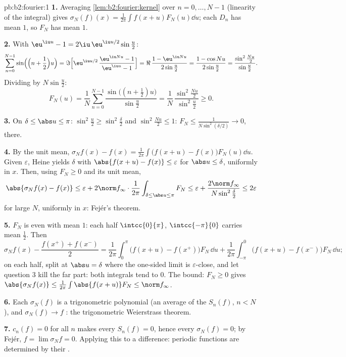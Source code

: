 \begin{solution}{pb:b2:fourier:1}
\textbf{1.} Averaging \cref{lem:b2:fourier:kernel} over $n = 0,
\dots, N-1$ (linearity of the integral) gives $\sigma_N(f)(x) =
\frac{1}{2\pi}\int f(x+u)F_N(u)\dd u$; each $D_n$ has mean
$1$, so $F_N$ has mean $1$.

\textbf{2.} With $\eu^{\iu u} - 1 = 2\iu\,\eu^{\iu
u/2}\sin\frac u2$:
\[
\sum_{n=0}^{N-1}\sin\Bigl(\Bigl(n + \frac12\Bigr)u\Bigr)
= \Im\Bigl[\eu^{\iu u/2}\,\frac{\eu^{\iu Nu} - 1}{\eu^{\iu u}
- 1}\Bigr]
= \Re\,\frac{1 - \eu^{\iu Nu}}{2\sin\frac u2}
= \frac{1 - \cos Nu}{2\sin\frac u2}
= \frac{\sin^2\frac{Nu}2}{\sin\frac u2} .
\]
Dividing by $N\sin\frac u2$:
\[
F_N(u) = \frac1N\sum_{n=0}^{N-1}
\frac{\sin\bigl((n+\frac12)u\bigr)}{\sin\frac u2}
= \frac{1}{N}\,
\frac{\sin^2\frac{Nu}{2}}{\sin^2\frac u2} \geq 0 .
\]

\textbf{3.} On $\delta \leq \abs u \leq \pi$: $\sin^2\frac u2
\geq \sin^2\frac\delta2$ and $\sin^2\frac{Nu}2 \leq 1$: $F_N
\leq \frac{1}{N\sin^2(\delta/2)} \to 0$,  there.

\textbf{4.} By the unit mean, $\sigma_Nf(x) - f(x) =
\frac{1}{2\pi}\int\bigl(f(x+u) - f(x)\bigr)F_N(u)\dd u$. Given
$\varepsilon$, Heine yields $\delta$ with $\abs{f(x+u) - f(x)}
\leq \varepsilon$ for $\abs u \leq \delta$, uniformly in $x$.
Then, using $F_N \geq 0$ and its unit mean,
\[
\abs{\sigma_Nf(x) - f(x)}
\leq \varepsilon +
2\norm f_\infty\cdot\frac{1}{2\pi}
\int_{\delta\leq\abs u\leq\pi}F_N
\leq \varepsilon + \frac{2\norm
f_\infty}{N\sin^2\frac\delta2}
\leq 2\varepsilon
\]
for large $N$, uniformly in $x$: Fej\'er's theorem.

\textbf{5.} $F_N$ is even with mean $1$: each half
$\intcc{0}{\pi}$, $\intcc{-\pi}{0}$ carries mean $\frac12$.
Then
\[
\sigma_Nf(x) - \frac{f(x^+)+f(x^-)}{2}
= \frac{1}{2\pi}\int_0^\pi\bigl(f(x+u) -
f(x^+)\bigr)F_N\,\dd u
+ \frac{1}{2\pi}\int_{-\pi}^0\bigl(f(x+u) -
f(x^-)\bigr)F_N\,\dd u ;
\]
on each half, split at $\abs u = \delta$ where the one-sided
limit is $\varepsilon$-close, and let question 3 kill the far
part: both integrals tend to $0$. The bound: $F_N \geq 0$
gives $\abs{\sigma_Nf(x)} \leq
\frac{1}{2\pi}\int\abs{f(x+u)}F_N \leq \norm f_\infty$.

\textbf{6.} Each $\sigma_N(f)$ is a trigonometric polynomial
(an average of the $S_n(f)$, $n < N$), and $\sigma_N(f) \to f$
: the trigonometric Weierstrass theorem.

\textbf{7.} $c_n(f) = 0$ for all $n$ makes every $S_n(f) = 0$,
hence every $\sigma_N(f) = 0$; by Fej\'er, $f = \lim\sigma_Nf =
0$. Applying this to a difference:  periodic
functions are determined by their .


\end{solution}
